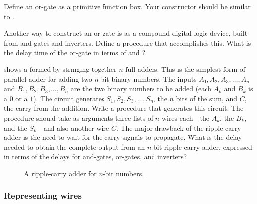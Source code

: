 \begin{exercise}
	\label{Exercise 3.28}
	Define an or-gate as a primitive function box.
	Your  constructor should be similar to .
\end{exercise}



\begin{exercise}
	\label{Exercise 3.29}
	Another way to construct an or-gate is as a compound digital logic device, built from and-gates and inverters.
	Define a procedure  that accomplishes this.
	What is the delay time of the or-gate in terms of  and ?
\end{exercise}



\begin{exercise}
	\label{Exercise 3.30}
	 shows a  formed by stringing together \( n \) full-adders.
	This is the simplest form of parallel adder for adding two \( n \)-bit binary numbers.
	The inputs \( A_1, A_2, A_3, \dotsc, A_n \) and \( B_1, B_2, B_3, \dotsc, B_n \) are the two binary numbers to be added (each \( A_k \) and \( B_k \) is a \( 0 \) or a \( 1 \)).
	The circuit generates \( S_1, S_2, S_3, \dotsc, S_n \), the \( n \) bits of the sum, and \( C \), the carry from the addition.
	Write a procedure  that generates this circuit.
	The procedure should take as arguments three lists of \( n \) wires each---the \( A_k \), the \( B_k \), and the \( S_k \)---and also another wire \( C \).
	The major drawback of the ripple-carry adder is the need to wait for the carry signals to propagate.
	What is the delay needed to obtain the complete output from an \( n \)-bit ripple-carry adder, expressed in terms of the delays for and-gates, or-gates, and inverters?
\end{exercise}



\begin{figure}[tb]
	\centering
	
	\caption{
		A ripple-carry adder for \( n \)-bit numbers.
	}
	\label{Figure 3.27}
\end{figure}



\subsubsection*{Representing wires}


